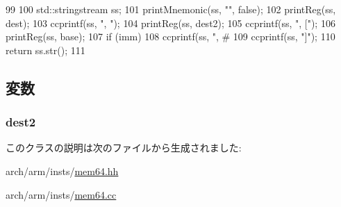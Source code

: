 \begin{DoxyCode}
99 {
100     std::stringstream ss;
101     printMnemonic(ss, "", false);
102     printReg(ss, dest);
103     ccprintf(ss, ", ");
104     printReg(ss, dest2);
105     ccprintf(ss, ", [");
106     printReg(ss, base);
107     if (imm)
108         ccprintf(ss, ", #%
109     ccprintf(ss, "]");
110     return ss.str();
111 }
\end{DoxyCode}


\subsection{変数}
\hypertarget{classArmISA_1_1MemoryDImm64_a0425ad33e25c8198da341b8d8c01fcba}{
\subsubsection[{dest2}]{ {\bf dest2}}}
\label{classArmISA_1_1MemoryDImm64_a0425ad33e25c8198da341b8d8c01fcba}


このクラスの説明は次のファイルから生成されました:\begin{DoxyCompactItemize}
\item 
arch/arm/insts/\hyperlink{mem64_8hh}{mem64.hh}\item 
arch/arm/insts/\hyperlink{mem64_8cc}{mem64.cc}\end{DoxyCompactItemize}
